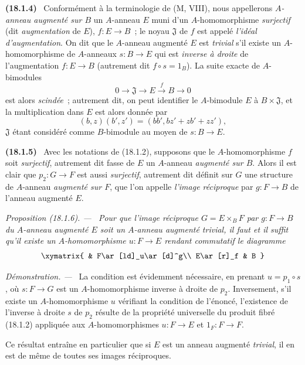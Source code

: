 \documentclass[10pt,oneside]{book}
\makeatletter
\newcommand{\setmanualcurrentlabel}[1]{\def\@currentlabel{#1}}
\newcommand{\oldpage}[2][]{%
  \setcounter{footnote}{0}%
  \marginpar{\scriptsize\textbf{#1}~|~#2}\ignorespaces}
\newenvironment{env}[1][]{\setmanualcurrentlabel{#1}\par\medskip\noindent\textbf{(#1)}\ }{\par}
\newenvironment{proposition}[1][]{%
  \setmanualcurrentlabel{#1}\par\medskip\noindent\itshape Proposition (#1). ---\ }{\par}
\newenvironment{proof}{%
  \par\medskip\noindent\textit{Démonstration. ---\ }}{\par}
\makeatother
\begin{document}
\begin{env}[18.1.4]
\label{0.18.1.4-fr}
Conformément à la terminologie de (M, VIII), nous appellerons
\emph{$A$-anneau augmenté sur $B$} un $A$-anneau $E$ muni d'un
$A$-homomorphisme \emph{surjectif} (dit \emph{augmentation} de $E$),
$f:E\to B$~; le noyau $\mathfrak{J}$ de $f$ est appelé
\emph{l'idéal d'augmentation}. On dit que le $A$-anneau augmenté $E$ est
\emph{trivial} s'il existe un $A$-homomorphisme de $A$-anneaux $s:B\to E$
qui est \emph{inverse à droite} de l'augmentation $f:E\to B$ (autrement dit
$f\circ s=1_B$). La suite exacte de $A$-bimodules
\[
  0\longrightarrow\mathfrak{J}\longrightarrow E
  \xrightarrow{f}B\longrightarrow0
\]
\oldpage[0\textsubscript{IV-1}]{53}
est alors \emph{scindée}~; autrement dit, on peut identifier le $A$-bimodule
$E$ à $B\times\mathfrak{J}$, et la multiplication dans $E$ est alors donnée
par
\[
  (b,z)(b',z')=(bb',bz'+zb'+zz'),
\]
$\mathfrak{J}$ étant considéré comme $B$-bimodule au moyen de $s:B\to E$.
\end{env}

\begin{env}[18.1.5]
\label{0.18.1.5-fr}
Avec les notations de (18.1.2), supposons que le $A$-homomorphisme $f$ soit
\emph{surjectif}, autrement dit fasse de $E$ un $A$-anneau \emph{augmenté sur
$B$}. Alors il est clair que $p_2:G\to F$ est aussi \emph{surjectif},
autrement dit définit sur $G$ une structure de $A$-anneau \emph{augmenté sur
$F$}, que l'on appelle \emph{l'image réciproque} par $g:F\to B$ de l'anneau
augmenté $E$.
\end{env}

\begin{proposition}[18.1.6]
\label{0.18.1.6-fr}
Pour que l'image réciproque $G=E\times_BF$ par $g:F\to B$ du $A$-anneau
augmenté $E$ soit un $A$-anneau augmenté trivial, il faut et il suffit qu'il
existe un $A$-homomorphisme $u:F\to E$ rendant commutatif le diagramme
\[
  \xymatrix{
    & F\ar[ld]_u\ar[d]^g\\
    E\ar[r]_f & B
  }
\]
\end{proposition}

\begin{proof}
La condition est évidemment nécessaire, en prenant $u=p_1\circ s$, où
$s:F\to G$ est un $A$-homomorphisme inverse à droite de $p_2$. Inversement,
s'il existe un $A$-homomorphisme $u$ vérifiant la condition de l'énoncé,
l'existence de l'inverse à droite $s$ de $p_2$ résulte de la propriété
universelle du produit fibré (18.1.2) appliquée aux $A$-homomorphismes
$u:F\to E$ et $1_F:F\to F$.

Ce résultat entraîne en particulier que si $E$ est un anneau augmenté
\emph{trivial}, il en est de même de toutes ses images réciproques.
\end{proof}
\end{document}
